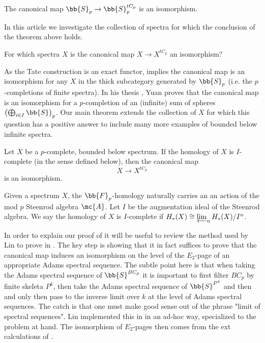 \begin{thm}  \label{linmainthm}
    The canonical map $\bb{S}_{p} \to \bb{S}_p^{tC_p}$ is an isomorphism.
\end{thm}

In this article we investigate the collection of spectra for which the conclusion of the theorem above holds.

\begin{ques*} 
    For which spectra $X$ is the canonical map 
    $ X \to X^{tC_p} $
    an isomorphism?
\end{ques*}

As the Tate construction is an exact functor,  implies the canonical map is an isomorphism for any $X$ in the thick subcategory generated by $\bb{S}_p$ (i.e. the $p$-completions of finite spectra). In his thesis \cite{yuan2021integral}, Yuan proves that the canonical map is an isomorphism for a $p$-completion of an (infinite) sum of spheres $\left( \bigoplus_{i \in I} \bb{S} \right)_{p}$. Our main theorem extends the collection of $X$ for which this question has a positive answer to include many more examples of bounded below infinite spectra. 





 
\begin{thm} 
    Let $X$ be a $p$-complete, bounded below spectrum.
    If the homology of $X$ is $I$-complete (in the sense defined below), then the canonical map
    \[ X \rightarrow X^{tC_p} \]
    is an isomorphism.
\end{thm}

\begin{defn} \label{defnInilpotent}
    Given a spectrum $X$, the $\bb{F}_p$-homology naturally carries an an action of the mod $p$ Steenrod algebra $\mc{A}$.     Let $I$ be the augmentation ideal of the Steenrod algebra. 
    We say the homology of $X$ is $I$-complete if 
    $H_{*}(X) \cong \varprojlim_{n} H_{*}(X)/I^{n}$.
\end{defn}

In order to explain our proof of  it will be useful to review the method used by Lin to prove  in \cite{lin1980conjectures}.
The key step is showing that it in fact suffices to prove that the canonical map induces an isomorphism on the level of the $E_2$-page of an appropriate Adams spectral sequence. The subtle point here is that when taking the Adams spectral sequence of $\bb{S}^{BC_p}$ it is important to first filter $BC_p$ by finite skeleta $P^k$, then take the Adams spectral sequence of $\bb{S}^{P^k}$ and then and only then pass to the inverse limit over $k$  at the level of Adams spectral sequences. The catch is that one must make good sense out of the phrase "limit of spectral sequences". Lin implemented this in \cite{lin1980conjectures} in an ad-hoc way, specialized to the problem at hand.
The isomorphism of $E_2$-pages then comes from the ext calculations of \cite{lin1980calculation}.

